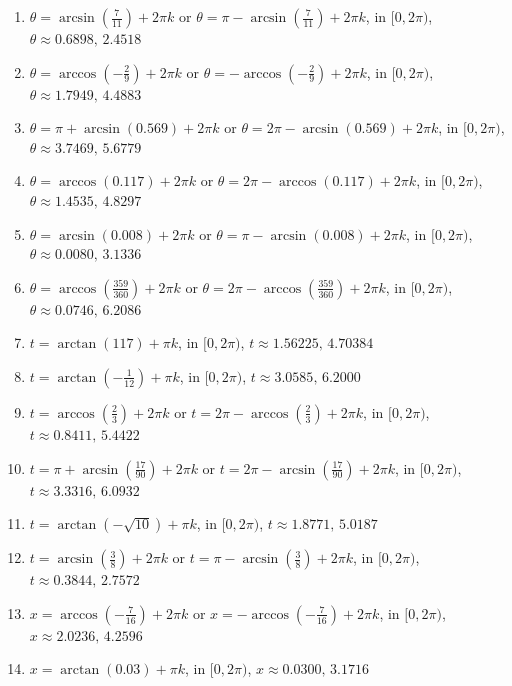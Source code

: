 \documentclass{ximera}
\begin{document}
\begin{enumerate}

\setcounter{enumi}{\value{HW}}

\item $\theta = \arcsin\left(\frac{7}{11}\right) + 2\pi k$ or $\theta = \pi - \arcsin\left(\frac{7}{11}\right) + 2\pi k$, in  $[0, 2\pi)$, $\theta \approx 0.6898, \, 2.4518$
\item $\theta = \arccos\left(-\frac{2}{9}\right) + 2\pi k$ or $\theta = - \arccos\left(-\frac{2}{9}\right) + 2\pi k$, in  $[0, 2\pi)$, $\theta \approx 1.7949, \, 4.4883$
\item $\theta = \pi + \arcsin(0.569) + 2\pi k$ or $\theta = 2\pi - \arcsin(0.569) + 2\pi k$, in  $[0, 2\pi)$, $\theta \approx 3.7469, \, 5.6779$
\item $\theta= \arccos(0.117) + 2\pi k$ or $\theta = 2\pi - \arccos(0.117) + 2\pi k$, in  $[0, 2\pi)$, $\theta \approx 1.4535, \, 4.8297$
\item $\theta = \arcsin(0.008) + 2\pi k$ or $\theta = \pi - \arcsin(0.008) + 2\pi k$, in  $[0, 2\pi)$, $\theta \approx 0.0080, \, 3.1336$
\item $\theta = \arccos\left(\frac{359}{360}\right) + 2\pi k$ or $\theta = 2\pi - \arccos\left(\frac{359}{360}\right) + 2\pi k$, in  $[0, 2\pi)$, $\theta \approx 0.0746, \, 6.2086$
\item $t = \arctan(117) + \pi k$, in  $[0, 2\pi)$, $t \approx 1.56225, \, 4.70384$
\item $t = \arctan\left(-\frac{1}{12}\right) + \pi k$, in  $[0, 2\pi)$,  $t \approx 3.0585, \, 6.2000$
\item $t = \arccos\left(\frac{2}{3}\right) + 2\pi k$ or $t = 2\pi - \arccos\left(\frac{2}{3}\right) + 2\pi k$, in  $[0, 2\pi)$, $t \approx 0.8411, \, 5.4422$
\item $t = \pi + \arcsin\left(\frac{17}{90}\right) + 2\pi k$ or $t = 2\pi - \arcsin\left(\frac{17}{90}\right) + 2\pi k$, in  $[0, 2\pi)$, $t \approx 3.3316, \, 6.0932$
\item $t = \arctan\left(-\sqrt{10}\right) + \pi k$, in  $[0, 2\pi)$, $t \approx 1.8771, \, 5.0187$
\item $t = \arcsin\left(\frac{3}{8}\right) + 2\pi k$ or $t = \pi - \arcsin\left(\frac{3}{8}\right) + 2\pi k$, in  $[0, 2\pi)$, $t \approx 0.3844, \, 2.7572$
\item $x =  \arccos\left(-\frac{7}{16}\right) + 2\pi k$ or $x = - \arccos\left(-\frac{7}{16}\right) + 2\pi k$, in  $[0, 2\pi)$, $x \approx 2.0236, \, 4.2596$
\item $x = \arctan(0.03) + \pi k$, in  $[0, 2\pi)$, $x \approx 0.0300, \, 3.1716$


\end{enumerate}
\end{document}
